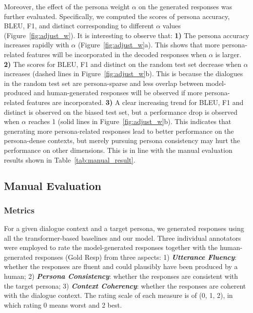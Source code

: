 \documentclass[letterpaper]{article} %
\begin{document}
Moreover, the effect of the persona weight $\alpha$ on the generated responses was further evaluated. Specifically, we computed the scores of persona accuracy, BLEU, F1, and distinct corresponding to different $\alpha$ values (Figure~\ref{fig:adjust_w}). It is interesting to observe that:
\textbf{1)} The persona accuracy increases rapidly with $\alpha$ (Figure~\ref{fig:adjust_w}a). This shows that more persona-related features will be incorporated in the decoded responses when $\alpha$ is larger.
\textbf{2)} The scores for BLEU, F1 and distinct on the random test set decrease when $\alpha$ increases (dashed lines in Figure~\ref{fig:adjust_w}b). This is because the dialogues in the random test set are persona-sparse and less overlap between model-produced and human-generated responses will be observed if more persona-related features are incorporated.
\textbf{3)} A clear increasing trend for BLEU, F1 and distinct is observed on the biased test set, but a performance drop is observed when $\alpha$ reaches 1 (solid lines in Figure~\ref{fig:adjust_w}b). This indicates that generating more persona-related responses lead to better performance on the persona-dense contexts, but merely pursuing persona consistency may hurt the performance on other dimensions. This is in line with the manual evaluation results shown in Table~\ref{tab:manual_result}.

\subsection{Manual Evaluation}
\subsubsection{Metrics}
For a given dialogue context and a target persona, we generated responses using all the transformer-based baselines and our model. Three individual annotators were employed to rate the model-generated responses together with the human-generated responses (Gold Resp) from three aspects:
1) \emph{\textbf{Utterance Fluency}}: whether the responses are fluent and could plausibly have been produced by a human;
2) \emph{\textbf{Persona Consistency}}: whether the responses are consistent with the target persona;
3) \emph{\textbf{Context Coherency}}: whether the responses are coherent with the dialogue context.
The rating scale of each measure is of (0, 1, 2), in which rating 0 means worst and 2 best.
\end{document}
